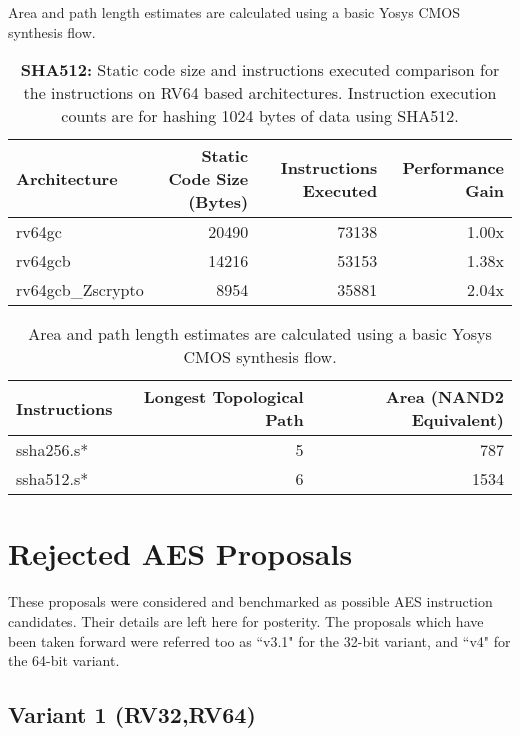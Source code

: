 Area and path length estimates are calculated using a basic Yosys CMOS
synthesis flow.

\begin{table}[h]
\centering
\begin{tabular}{lrrr}
Architecture      & Static Code Size (Bytes) & Instructions Executed & Performance Gain \\ \hline
rv64gc            & 20490                    & 73138 & 1.00x          \\
rv64gcb           & 14216                    & 53153 & 1.38x          \\
rv64gcb\_Zscrypto & 8954                     & 35881 & 2.04x 
\end{tabular}
\caption{{\bf SHA512:}
Static code size and instructions executed comparison for
the  instructions on RV64 based architectures.
Instruction execution counts are for hashing 1024 bytes of data
using SHA512.
}
\label{tab:benchmarks:sha512}
\end{table}

\begin{table}[h]
\centering
\begin{tabular}{lrr}
Instructions   & Longest Topological Path & Area (NAND2 Equivalent) \\ \hline
ssha256.s*     & 5                        & 787                   \\
ssha512.s*     & 6                        & 1534                  \\
\end{tabular}
\caption{
Area and path length estimates are calculated using a basic Yosys CMOS
synthesis flow.
}
\label{tab:benchmarks:sha2:rtl}
\end{table}



\section{Rejected AES Proposals}

These proposals were considered and benchmarked as possible AES instruction
candidates.
Their details are left here for posterity.
The proposals which have been taken forward were referred too as
``v3.1" for the 32-bit variant, and ``v4" for the 64-bit variant.


\subsection{Variant 1 (RV32,RV64)}

